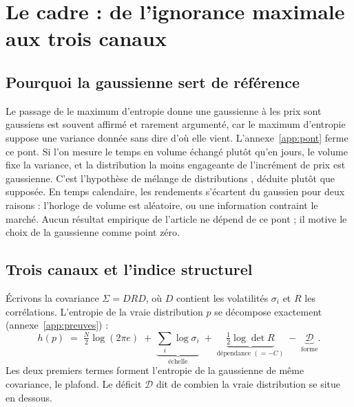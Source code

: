 \documentclass[11pt]{article}
\theoremstyle{definition}
\newcommand{\DD}{\mathcal{D}}
\begin{document}
\section{Le cadre : de l'ignorance maximale aux trois canaux}
\label{sec:cadre}

\subsection{Pourquoi la gaussienne sert de référence}

Le passage de \og le maximum d'entropie donne une gaussienne \fg{} à \og les
prix sont gaussiens \fg{} est souvent affirmé et rarement argumenté, car le
maximum d'entropie suppose une variance donnée sans dire d'où elle vient.
L'annexe~\ref{app:pont} ferme ce pont. Si l'on mesure le temps en volume
échangé plutôt qu'en jours, le volume fixe la variance, et la distribution la
moins engageante de l'incrément de prix est gaussienne. C'est l'hypothèse de
mélange de distributions \citep{clark1973,ane2000}, déduite plutôt que
supposée. En temps calendaire, les rendements s'écartent du gaussien pour deux
raisons : l'horloge de volume est aléatoire, ou une information contraint le
marché. Aucun résultat empirique de l'article ne dépend de ce pont ; il motive
le choix de la gaussienne comme point zéro.

\subsection{Trois canaux et l'indice structurel}

Écrivons la covariance $\Sigma=DRD$, où $D$ contient les volatilités
$\sigma_i$ et $R$ les corrélations. L'entropie de la vraie distribution $p$ se
décompose exactement (annexe~\ref{app:preuves}) :
\begin{equation}
\label{eq:three}
h(p) \;=\; \tfrac{N}{2}\log(2\pi e)
\;+\; \underbrace{\textstyle\sum_i \log\sigma_i}_{\text{échelle}}
\;+\; \underbrace{\tfrac12\log\det R}_{\text{dépendance }(=-C)}
\;-\; \underbrace{\DD}_{\text{forme}} .
\end{equation}
Les deux premiers termes forment l'entropie de la gaussienne de même
covariance, le plafond. Le déficit $\DD$ dit de combien la vraie distribution
se situe en dessous.
\end{document}

